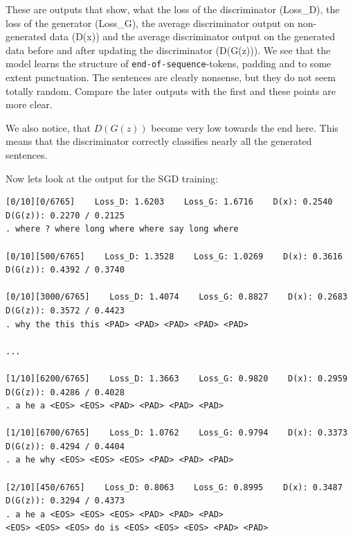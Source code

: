 \documentclass{article}
\begin{document}
These are outputs that show, what the loss of the discriminator (Loss\_D), the
loss of the generator (Loss\_G), the average discriminator output on
non-generated data (D(x)) and the average discriminator output on the
generated data before and after updating the discriminator (D(G(z))). We see
that the model learns the structure of \texttt{end-of-sequence}-tokens, padding
and to some extent punctuation. The sentences are clearly nonsense, but they
do not seem totally random. Compare the later outputs with the first and these
points are more clear.

We also notice, that $D(G(z))$ become very low towards the end here. This means
that the discriminator correctly classifies nearly all the generated sentences. 

Now lets look at the output for the SGD training:

\begin{verbatim}
[0/10][0/6765]    Loss_D: 1.6203    Loss_G: 1.6716    D(x): 0.2540    D(G(z)): 0.2270 / 0.2125
. where ? where long where where say long where

[0/10][500/6765]    Loss_D: 1.3528    Loss_G: 1.0269    D(x): 0.3616    D(G(z)): 0.4392 / 0.3740

[0/10][3000/6765]    Loss_D: 1.4074    Loss_G: 0.8827    D(x): 0.2683    D(G(z)): 0.3572 / 0.4423
. why the this this <PAD> <PAD> <PAD> <PAD> <PAD>

...

[1/10][6200/6765]    Loss_D: 1.3663    Loss_G: 0.9820    D(x): 0.2959    D(G(z)): 0.4286 / 0.4028
. a he a <EOS> <EOS> <PAD> <PAD> <PAD> <PAD>

[1/10][6700/6765]    Loss_D: 1.0762    Loss_G: 0.9794    D(x): 0.3373    D(G(z)): 0.4294 / 0.4404
. a he why <EOS> <EOS> <EOS> <PAD> <PAD> <PAD>

[2/10][450/6765]    Loss_D: 0.8063    Loss_G: 0.8995    D(x): 0.3487    D(G(z)): 0.3294 / 0.4373
. a he a <EOS> <EOS> <EOS> <PAD> <PAD> <PAD>
<EOS> <EOS> <EOS> do is <EOS> <EOS> <EOS> <PAD> <PAD>


\end{verbatim}
\end{document}
